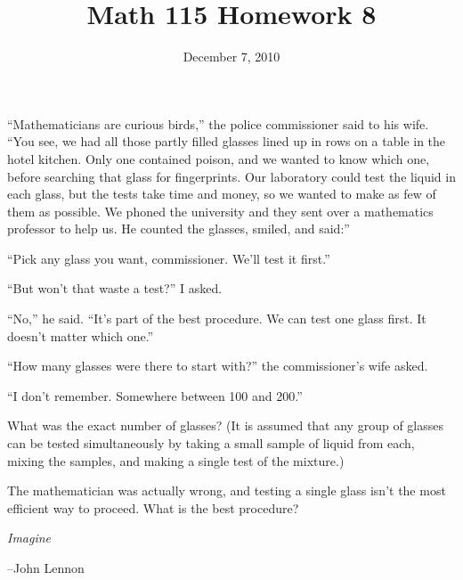 \documentclass[fleqn,addpoints]{exam}
\title{Math 115 Homework 8}
\date{December 7, 2010}
\begin{document}
\maketitle
 

``Mathematicians are curious birds,'' the police commissioner said to his wife. ``You see, we had all those partly filled
glasses lined up in rows on a table in the hotel kitchen. Only one contained poison, and we wanted to know which one,
before searching that glass for fingerprints. Our laboratory could test the liquid in each glass, but the tests take
time and money, so we wanted to make as few of them as possible. We phoned the university and they sent over a
mathematics professor to help us. He counted the glasses, smiled, and said:''

``Pick any glass you want, commissioner. We'll test it first.''

``But won't that waste a test?'' I asked.

``No,'' he said. ``It's part of the best procedure. We can test one glass first. It doesn't matter which one.''

``How many glasses were there to start with?'' the commissioner's wife asked.

``I don't remember. Somewhere between 100 and 200.''

\begin{questions}
\question What was the exact number of glasses? (It is assumed that any group of glasses can be tested simultaneously by taking a
small sample of liquid from each, mixing the samples, and making a single test of the mixture.)

\question The mathematician was actually wrong, and testing a single glass isn't the most efficient way to
proceed.  What is the best procedure? 

\end{questions}

\ifprintanswers

\fi

\ifprintanswers
\else
\vspace{8 cm}

{\em Imagine}

\vspace{.1 cm}
\hspace{1 cm} --John Lennon

\fi
\end{document}
